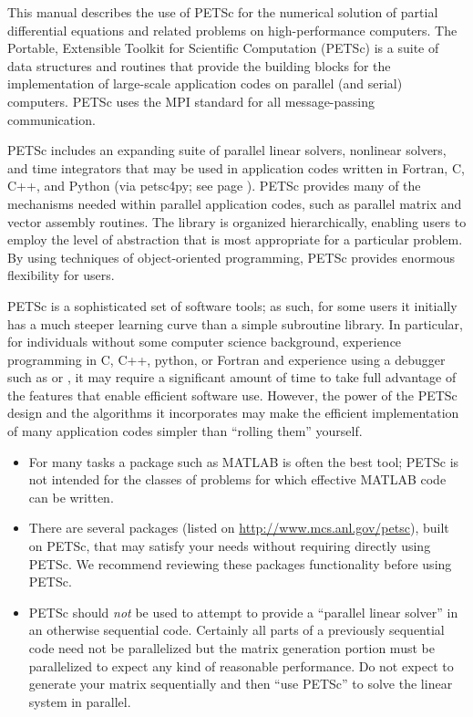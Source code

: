 
%
%

\medskip \medskip
This manual describes the use of PETSc for the numerical solution
of partial differential equations and related problems
on high-performance computers.  The
Portable, Extensible Toolkit for Scientific Computation (PETSc) is a
suite of data structures and routines that provide the building
blocks for the implementation of large-scale application codes on parallel
(and serial) computers.  PETSc uses the MPI standard for all
message-passing communication.

PETSc includes an expanding suite of parallel linear solvers, nonlinear
solvers, and time integrators that may be
used in application codes written in Fortran, C, C++, and Python (via petsc4py; see page \pageref{petsc4py}).  PETSc
provides many of the mechanisms needed within parallel application
codes, such as parallel matrix and vector assembly routines. The library is
organized hierarchically, enabling users to employ the level of
abstraction that is most appropriate for a particular problem. By
using techniques of object-oriented programming, PETSc provides
enormous flexibility for users.

PETSc is a sophisticated set of software tools; as such, for some
users it initially has a much steeper learning curve than a simple
subroutine library. In particular, for individuals without some
computer science background, experience programming in C, C++, python, or Fortran and experience using a debugger such as  or , it
may require a significant amount of time to take full advantage of the
features that enable efficient software use.  However, the power of
the PETSc design and the algorithms it incorporates may make the efficient
implementation of many application codes simpler than ``rolling
them'' yourself.
\begin{itemize}
\item  For many tasks a package such as MATLAB is often the best tool; PETSc is not
intended for the classes of problems for which effective MATLAB code
can be written.
\item There are several packages (listed on \href{http://www.mcs.anl.gov/petsc}{http://www.mcs.anl.gov/petsc}),
built on PETSc, that may satisfy your needs without requiring directly using PETSc. We recommend reviewing these packages
functionality before using PETSc.
\item PETSc should {\em not} be used to attempt to provide
a ``parallel linear solver'' in an otherwise sequential code.
Certainly all parts of a previously sequential code need not be parallelized but the
matrix generation portion must be parallelized to expect any kind of reasonable performance.
Do not expect to generate your matrix sequentially and then ``use PETSc'' to solve
the linear system in parallel.
\end{itemize}

